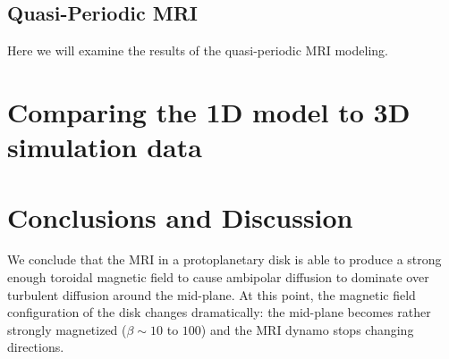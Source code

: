 


\subsection{Quasi-Periodic MRI}
Here we will examine the results of the quasi-periodic MRI modeling.  






\section{Comparing the 1D model to 3D simulation data}





\section{Conclusions and Discussion}
We conclude that the MRI in a protoplanetary disk is able to produce a strong enough toroidal magnetic field to cause ambipolar diffusion to dominate over turbulent diffusion around the mid-plane.  At this point, the magnetic field configuration of the disk changes dramatically: the mid-plane becomes rather strongly magnetized ($\beta \sim 10$ to $100$) and the MRI dynamo stops changing directions.

